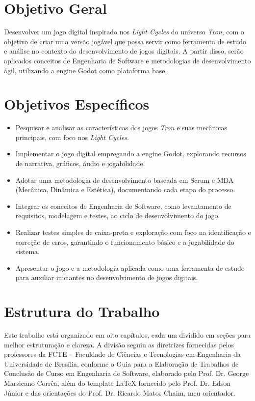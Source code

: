 \section*{Objetivo Geral}

Desenvolver um jogo digital inspirado nos \textit{Light Cycles} do universo \textit{Tron}, com o objetivo de criar uma versão jogável que possa servir como ferramenta de estudo e análise no contexto do desenvolvimento de jogos digitais. A partir disso, serão aplicados conceitos de Engenharia de Software e metodologias de desenvolvimento ágil, utilizando a engine Godot como plataforma base.

\section*{Objetivos Específicos}

\begin{itemize}
  \item Pesquisar e analisar as características dos jogos \textit{Tron} e suas mecânicas principais, com foco nos \textit{Light Cycles}.
  \item Implementar o jogo digital empregando a engine Godot, explorando recursos de narrativa, gráficos, áudio e jogabilidade.
  \item Adotar uma metodologia de desenvolvimento baseada em Scrum e MDA (Mecânica, Dinâmica e Estética), documentando cada etapa do processo.
  \item Integrar os conceitos de Engenharia de Software, como levantamento de requisitos, modelagem e testes, ao ciclo de desenvolvimento do jogo.
  \item Realizar testes simples de caixa-preta e exploração com foco na identificação e correção de erros, garantindo o funcionamento básico e a jogabilidade do sistema.
  \item Apresentar o jogo e a metodologia aplicada como uma ferramenta de estudo para auxiliar iniciantes no desenvolvimento de jogos digitais.
\end{itemize}

\section*{Estrutura do Trabalho}

Este trabalho está organizado em oito capítulos, cada um dividido em seções para melhor estruturação e clareza. A divisão seguiu as diretrizes fornecidas pelos professores da FCTE – Faculdade de Ciências e Tecnologias em Engenharia da Universidade de Brasília, conforme o Guia para a Elaboração de Trabalhos de Conclusão de Curso em Engenharia de Software, elaborado pelo Prof. Dr. George Marsicano Corrêa, além do template LaTeX fornecido pelo Prof. Dr. Edson Júnior e das orientações do Prof. Dr. Ricardo Matos Chaim, meu orientador.

